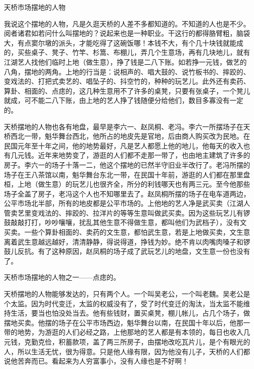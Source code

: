 \documentclass[12pt,UTF8]{ctexbook}
\begin{document}
天桥市场摆地的人物


我说这个摆地的人物，凡是久逛天桥的人差不多都知道的。不知道的人也是不少。阅者诸君如若问什么叫摆地的？说起来也是一种职业。干这行的都得胳臂粗，脑袋大，有点窦尔墩的派头，才能吃得了这碗饭哪！本钱不大，有个几十块钱就能成的，买些桌子、凳子、竹竿、杉篙、布棚儿，弄几个生意场，再有几块地儿，就有江湖艺人找他们临时上地（做生意），挣了钱是二八下账。如若挣一元钱，做艺的八角，摆地的两角。上地的行当是：说相声的、唱大鼓的、说竹板书的、摔跤的、变戏法的、打把式卖艺的、唱坠子的、抖空竹的，种种的玩艺儿。此外还有卖药、算卦、相面的、点痣的，这几种生意用不了许多的桌凳，只要有张桌子，一个凳儿就成，可不能二八下账，由上地的艺人挣了钱随便分给他们，数目多寡没有一定的。

天桥摆地的人物也各有地盘，最早是李六一、赵凤桐、老冯。李六一所摆场子在天桥西北一带，魁华舞台西北，他所占的地皮先是官地，后由商人购买改为民地。在民国元年至十年之间，他的地势最好，凡是艺人都愿上他的地儿，他每天的收入也有几元钱。近年来地势变了，游逛的人们都不走那一带了，也由地主建筑了许多的房子。李六一的场子十落一二，他这个摆地的已然半守旧业半改行了。老冯所摆的场子在王八茶馆以南，魁华舞台东北一带，在民国十年前，游逛的人们都在那里盘桓，上地（做生意）的玩艺儿也很齐全，所分的利钱哪天也有两三元。至今他那些场子全盖了房子，老冯这个人也不知哪里去了。赵凤桐所摆的场子在电车道两边，公平市场北半部，所有的地皮都是公平市场的。上他地的艺人净是武买卖（江湖人管卖艺里变戏法的、摔跤的、拉洋片的等等生意叫做武买卖。因为这些玩艺儿有锣鼓敲敲打打，吵吵嚷嚷，扰乱其他生意不得做生意，都叫他们为武档子），没有文买卖。一些个算卦相面的、卖药的文生意，都怕武生意，若是上地做买卖，文生意离着武生意越远越好，清清静静，得说得道，挣钱为妙。绝不肯以肉嘴肉嗓子和锣鼓儿反抗。有了这种原因，赵凤桐的场子成了武玩艺儿的地盘，文生意一份也没有了。

天桥市场摆地的人物之一——点痣的。



天桥摆地的人物能够发达的，只有两个人。一个叫吴老公，一个叫老魏。吴老公是个太监。因为时代变迁，太监的权威没有了，受了时代变迁的淘汰，当太监不能维持生活，要当也怕没处当去。他有些钱财，置买桌凳，棚儿帐儿，占几个场子，做摆地买卖。他摆的场子在公平市场西边，魁华舞台以南，在民国十年以后，他那一带的地势，为游逛的人们必经之路，上他那地的艺人都是有本领的，每日也收入几元钱，克勤克俭，积蓄款项，盖了两三所房子，由摆地改吃瓦片儿，是个有眼光的人，所以生活无忧，很为得意。只是他人缘有限，因为他没有儿子，天桥的人们都说他苦奔而已。看起来为人穷富事小，没有人缘也是不好啊！
\end{document}
